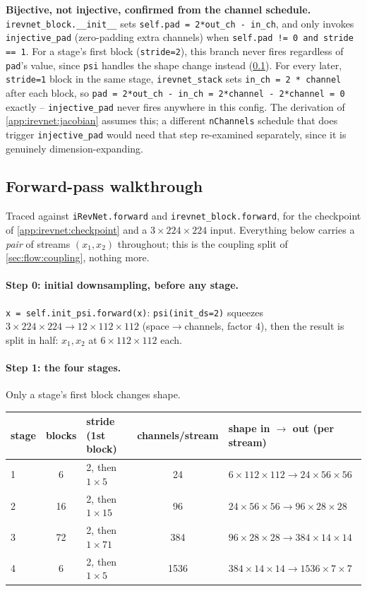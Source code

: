 \textbf{Bijective, not injective, confirmed from the channel schedule.} \texttt{irevnet\_block.\_\_init\_\_}
sets \texttt{self.pad = 2*out\_ch - in\_ch}, and only invokes \texttt{injective\_pad} (zero-padding extra
channels) when \texttt{self.pad != 0 and stride == 1}. For a stage's first block (\texttt{stride=2}), this
branch never fires regardless of \texttt{pad}'s value, since \texttt{psi} handles the shape change instead
(\cref{app:irevnet:walkthrough}). For every later, \texttt{stride=1} block in the same stage,
\texttt{irevnet\_stack} sets \texttt{in\_ch = 2 * channel} after each block, so
\texttt{pad = 2*out\_ch - in\_ch = 2*channel - 2*channel = 0} exactly -- \texttt{injective\_pad} never fires
anywhere in this config. The derivation of \cref{app:irevnet:jacobian} assumes this; a different
\texttt{nChannels} schedule that does trigger \texttt{injective\_pad} would need that step re-examined
separately, since it is genuinely dimension-expanding.
\newpage
\subsection{Forward-pass walkthrough}
\label{app:irevnet:walkthrough}
Traced against \texttt{iRevNet.forward} and \texttt{irevnet\_block.forward}, for the checkpoint of
\cref{app:irevnet:checkpoint} and a $3\times224\times224$ input. Everything below carries a \emph{pair} of
streams $(x_1,x_2)$ throughout; this is the coupling split of \cref{sec:flow:coupling}, nothing more.

\paragraph{Step 0: initial downsampling, before any stage.} \texttt{x = self.init\_psi.forward(x)}: 
\texttt{psi(init\_ds=2)} squeezes $3\times224\times224\to12\times112\times112$ (space$\to$channels, factor
$4$), then the result is split in half: $x_1,x_2$ at $6\times112\times112$ each.

\paragraph{Step 1: the four stages.} Only a stage's first block changes shape.
\begin{center}
\begin{tabular}{@{}lclcl@{}}
\toprule
stage & blocks & stride (1st block) & channels/stream & shape in $\to$ out (per stream)\\
\midrule
1 & 6  & 2, then $1\times5$  & 24   & $6\times112\times112\to24\times56\times56$\\
2 & 16 & 2, then $1\times15$ & 96   & $24\times56\times56\to96\times28\times28$\\
3 & 72 & 2, then $1\times71$ & 384  & $96\times28\times28\to384\times14\times14$\\
4 & 6  & 2, then $1\times5$  & 1536 & $384\times14\times14\to1536\times7\times7$\\
\bottomrule
\end{tabular}
\end{center}

